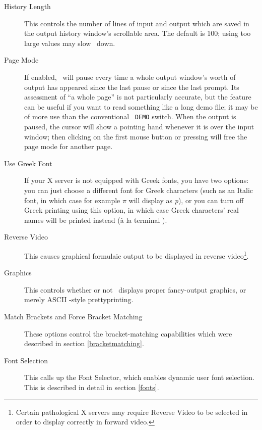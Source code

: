 \begin{description}

\item[History Length] This controls the number of lines of input and
output which are saved in the output history window's scrollable
area.  The default is 100; using too large values may slow \xr\ down.

\item[Page Mode] If enabled, \xr\ will pause every time a whole output
window's worth of output has appeared since the last pause or since
the last prompt.  Its assessment of ``a whole page'' is not
particularly accurate, but the feature can be useful if you want to
read something like a long demo file; it may be of more use than the
conventional \REDUCE\ {\tt DEMO} switch.  When the output is paused,
the cursor will show a pointing hand whenever it is over the input
window; then clicking on the first mouse button or pressing
 will free the page mode for another page.

\item[Use Greek Font] If your X server is not equipped with Greek
fonts, you have two options: you can just choose a different font for
Greek characters (such as an Italic font, in which case for example
$\pi$ will display as {\it p\/}), or you can turn off Greek printing
using this option, in which case Greek characters' real names will be
printed instead (\`a la terminal \REDUCE{}).

\item[Reverse Video] This causes graphical formulaic output to be
displayed in reverse video\footnote{Certain pathological X servers may
require Reverse Video to be selected in order to display correctly in
forward video.}.

\item[Graphics] This controls whether or not \xr\ displays proper
fancy-output graphics, or merely ASCII \REDUCE{}-style
prettyprinting.

\item[Match Brackets {\rm and} Force Bracket Matching] These options
control the bracket-matching capabilities which were described in
section \ref{bracketmatching}.

\item[Font Selection] This calls up the Font Selector, which enables
dynamic user font selection.  This is described in detail in section
\ref{fonts}.

\end{description}

